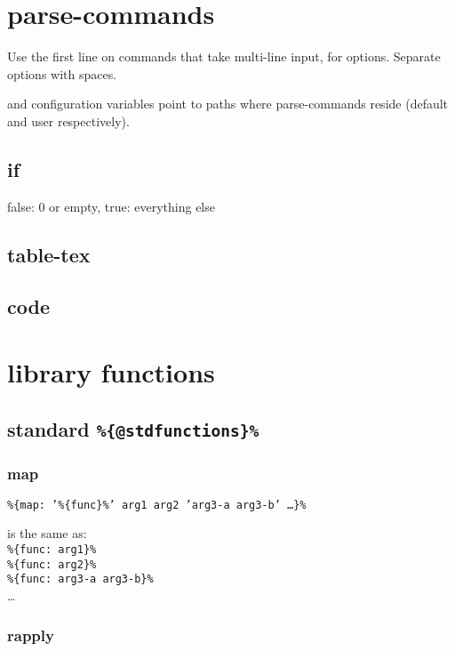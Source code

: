\documentclass{memoir}
\newcommand{\var}[1]{\texttt{\%\{#1\}\%}}
\begin{document}

\chapter{parse-commands} %
	Use the first line on commands that take multi-line input, for options.
	Separate options with spaces.

	and  configuration variables point to paths where 
	parse-commands reside (default and user respectively).

	\section{if} false: 0 or empty, true: everything else
	\section{table-tex}
	\section{code}


\chapter{library functions} %

	\section{standard \var{@stdfunctions}} %

		\subsection{map} %
			\var{map: '\var{func}' arg1 arg2 'arg3-a arg3-b' \ldots}

			is the same as:\\
			\var{func: arg1}\\
			\var{func: arg2}\\
			\var{func: arg3-a arg3-b}\\
			\ldots


		\subsection{rapply}
\end{document}
